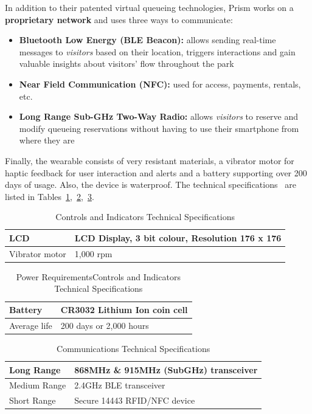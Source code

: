 In addition to their patented virtual queueing technologies, Prism works on a \textbf{proprietary network} and uses three ways to communicate:
\begin{itemize}
    \item \textbf{Bluetooth Low Energy (BLE Beacon):} allows sending real-time messages to \textit{visitors} based on their location, triggers interactions and gain valuable insights about visitors' flow throughout the park
    \item \textbf{Near Field Communication (NFC):} used for access, payments, rentals, etc.
    \item \textbf{Long Range Sub-GHz Two-Way Radio:} allows \textit{visitors} to reserve and modify queueing reservations without having to use their smartphone from where they are
\end{itemize}

Finally, the wearable consists of very resistant materials, a vibrator motor for haptic feedback for user
interaction and alerts and a battery supporting over 200 days of usage.
Also, the device is waterproof.
The technical specifications~\cite{prism-manual} are listed in Tables~\ref{tab:ci-tec-spec},~\ref{tab:pr-tec-spec},~\ref{tab:c-tec-spec}.

\begin{table}[H]
    \centering
    \begin{tabular}{|l|l|}
        \hline
        LCD & LCD Display, 3 bit colour, Resolution 176 x 176 \\ \hline
        Vibrator motor & 1,000 rpm \\
        \hline
    \end{tabular}
    \caption{Controls and Indicators Technical Specifications}
    \label{tab:ci-tec-spec}
\end{table}
\begin{table}[H]
    \centering
    \begin{tabular}{|l|l|}
        \hline
        Battery & CR3032 Lithium Ion coin cell \\ \hline
        Average life & 200 days or 2,000 hours \\
        \hline
    \end{tabular}
    \caption{Power RequirementsControls and Indicators Technical Specifications}
    \label{tab:pr-tec-spec}
\end{table}
\begin{table}[H]
    \centering
    \begin{tabular}{|l|l|}
        \hline
        Long Range & 868MHz \& 915MHz (SubGHz) transceiver \\ \hline
        Medium Range & 2.4GHz BLE transceiver \\ \hline
        Short Range & Secure 14443 RFID/NFC device \\
        \hline
    \end{tabular}
    \caption{Communications Technical Specifications}
    \label{tab:c-tec-spec}
\end{table}

